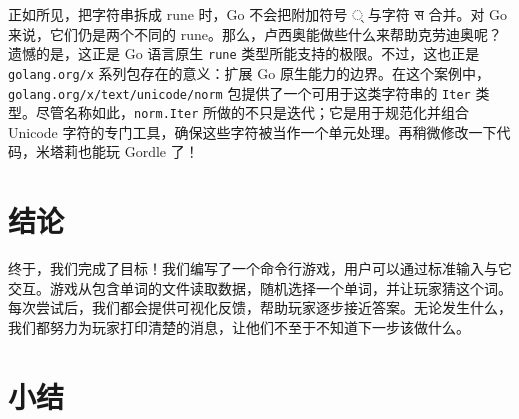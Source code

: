 正如所见，把字符串拆成 rune 时，Go 不会把附加符号 ् 与字符 स 合并。对 Go 来说，它们仍是两个不同的 rune。那么，卢西奥能做些什么来帮助克劳迪奥呢？遗憾的是，这正是 Go 语言原生 \texttt{rune} 类型所能支持的极限。不过，这也正是 \texttt{golang.org/x} 系列包存在的意义：扩展 Go 原生能力的边界。在这个案例中，\texttt{golang.org/x/text/unicode/norm} 包提供了一个可用于这类字符串的 \texttt{Iter} 类型。尽管名称如此，\texttt{norm.Iter} 所做的不只是迭代；它是用于规范化并组合 Unicode 字符的专门工具，确保这些字符被当作一个单元处理。再稍微修改一下代码，米塔莉也能玩 Gordle 了！

\section{结论}

终于，我们完成了目标！我们编写了一个命令行游戏，用户可以通过标准输入与它交互。游戏从包含单词的文件读取数据，随机选择一个单词，并让玩家猜这个词。每次尝试后，我们都会提供可视化反馈，帮助玩家逐步接近答案。无论发生什么，我们都努力为玩家打印清楚的消息，让他们不至于不知道下一步该做什么。

\section*{小结}

